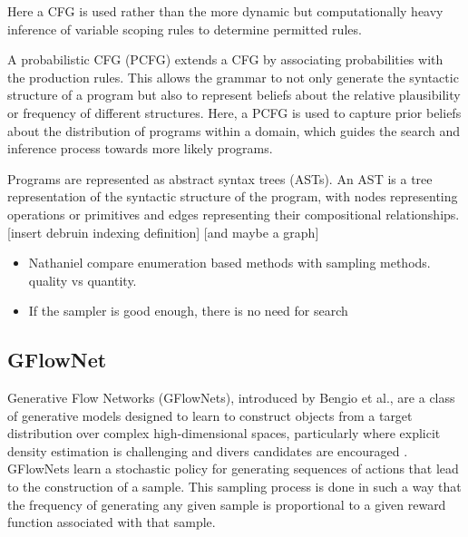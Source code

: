 Here a CFG is used rather than the more dynamic but computationally heavy inference of variable scoping rules to determine permitted rules.

A probabilistic CFG (PCFG) extends a CFG by associating probabilities with the production rules. This allows the grammar to not only generate the syntactic structure of a program but also to represent beliefs about the relative plausibility or frequency of different structures. Here, a PCFG is used to capture prior beliefs about the distribution of programs within a domain, which guides the search and inference process towards more likely programs.

Programs are represented as abstract syntax trees (ASTs). An AST is a tree representation of the syntactic structure of the program, with nodes representing operations or primitives and edges representing their compositional relationships.
[insert debruin indexing definition]
[and maybe a graph]


\begin{itemize}
    \item Nathaniel compare enumeration based methods with sampling methods. quality vs quantity.
    \item If the sampler is good enough, there is no need for search
\end{itemize}




\subsection{GFlowNet}






Generative Flow Networks (GFlowNets), introduced by Bengio et al., are a class of generative models designed to learn to construct objects from a target distribution over complex high-dimensional spaces, particularly where explicit density estimation is challenging and divers candidates are encouraged \cite{bengio_flow_2021}. GFlowNets learn a stochastic policy for generating sequences of actions that lead to the construction of a sample. This sampling process is done in such a way that the frequency of generating any given sample is proportional to a given reward function associated with that sample.

